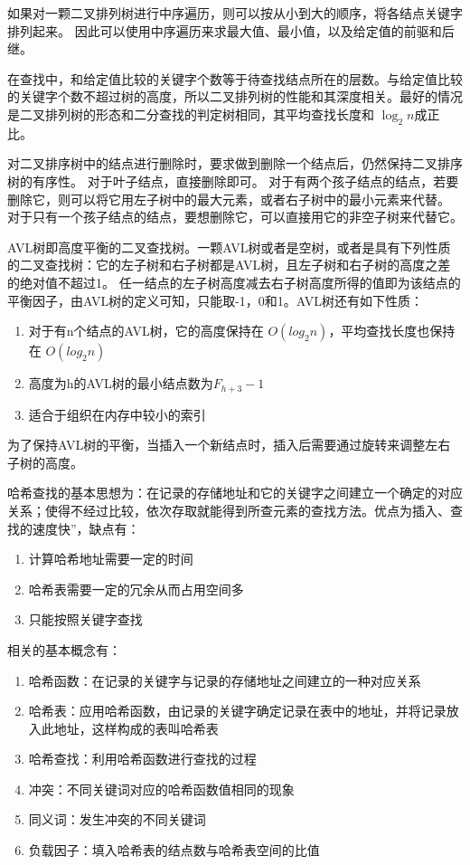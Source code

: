 \documentclass[a4paper,11pt]{article}%
\begin{document}
如果对一颗二叉排列树进行中序遍历，则可以按从小到大的顺序，将各结点关键字排列起来。
因此可以使用中序遍历来求最大值、最小值，以及给定值的前驱和后继。

在查找中，和给定值比较的关键字个数等于待查找结点所在的层数。与给定值比较的关键字个数不超过树的高度，所以二叉排列树的性能和其深度相关。最好的情况是二叉排列树的形态和二分查找的判定树相同，其平均查找长度和 $\log_2n$成正比。

对二叉排序树中的结点进行删除时，要求做到删除一个结点后，仍然保持二叉排序树的有序性。
对于叶子结点，直接删除即可。
对于有两个孩子结点的结点，若要删除它，则可以将它用左子树中的最大元素，或者右子树中的最小元素来代替。
对于只有一个孩子结点的结点，要想删除它，可以直接用它的非空子树来代替它。

AVL树即高度平衡的二叉查找树。一颗AVL树或者是空树，或者是具有下列性质的二叉查找树：它的左子树和右子树都是AVL树，且左子树和右子树的高度之差的绝对值不超过1。
任一结点的左子树高度减去右子树高度所得的值即为该结点的平衡因子，由AVL树的定义可知，只能取-1，0和1。AVL树还有如下性质：
\begin{enumerate}
    \item 对于有n个结点的AVL树，它的高度保持在 $O(log_2n)$，平均查找长度也保持在 $O(log_2n)$
    \item 高度为h的AVL树的最小结点数为$F_{h+3}-1$
    \item  适合于组织在内存中较小的索引
\end{enumerate}

为了保持AVL树的平衡，当插入一个新结点时，插入后需要通过旋转来调整左右子树的高度。

哈希查找的基本思想为：在记录的存储地址和它的关键字之间建立一个确定的对应关系；使得不经过比较，依次存取就能得到所查元素的查找方法。优点为插入、查找的速度快”，缺点有：
\begin{enumerate}
    \item 计算哈希地址需要一定的时间
\item 哈希表需要一定的冗余从而占用空间多
\item 只能按照关键字查找
\end{enumerate}

相关的基本概念有：
\begin{enumerate}
    \item 哈希函数：在记录的关键字与记录的存储地址之间建立的一种对应关系
\item 哈希表：应用哈希函数，由记录的关键字确定记录在表中的地址，并将记录放入此地址，这样构成的表叫哈希表
\item 哈希查找：利用哈希函数进行查找的过程
\item  冲突：不同关键词对应的哈希函数值相同的现象
\item 同义词：发生冲突的不同关键词
\item 负载因子：填入哈希表的结点数与哈希表空间的比值
\end{enumerate}
\end{document}
